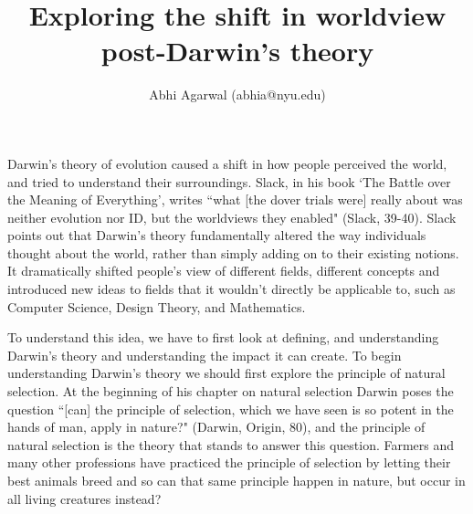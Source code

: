 \documentclass[11pt, oneside]{article}
\title{Exploring the shift in worldview post-Darwin's theory}
\author{Abhi Agarwal (abhia@nyu.edu)}
\date{}
\begin{document}
\maketitle



\par Darwin's theory of evolution caused a shift in how people perceived the world, and tried to understand their surroundings. Slack, in his book `The Battle over the Meaning of Everything', writes ``what [the dover trials were] really about was neither evolution nor ID, but the worldviews they enabled" (Slack, 39-40). Slack points out that Darwin's theory fundamentally altered the way individuals thought about the world, rather than simply adding on to their existing notions. It dramatically shifted people's view of different fields, different concepts and introduced new ideas to fields that it wouldn't directly be applicable to, such as Computer Science, Design Theory, and Mathematics. 


\par To understand this idea, we have to first look at defining, and understanding Darwin's theory and understanding the impact it can create. To begin understanding Darwin's theory we should first explore the principle of natural selection. At the beginning of his chapter on natural selection Darwin poses the question ``[can] the principle of selection, which we have seen is so potent in the hands of man, apply in nature?" (Darwin, Origin, 80), and the principle of natural selection is the theory that stands to answer this question. Farmers and many other professions have practiced the principle of selection by letting their best animals breed and so can that same principle happen in nature, but occur in all living creatures instead? 
\end{document}
